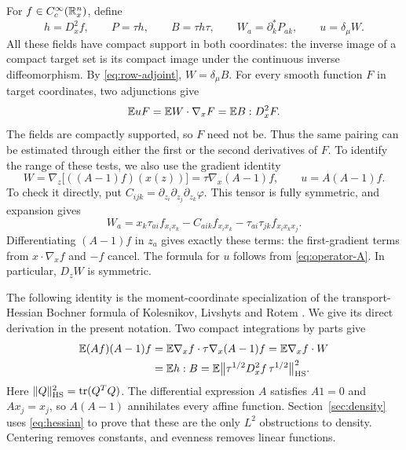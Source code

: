For $f\in C_c^\infty(\mathbb R_x^n)$, define
\begin{equation}\label{eq:test-fields}
 h=D_x^2f,\qquad P=\tau h,\qquad B=\tau h\tau,
 \qquad W_a=\partial_k^*P_{ak},\qquad u=\delta_\mu W.
\end{equation}
All these fields have compact support in both coordinates: the inverse
image of a compact target set is its compact image under the continuous
inverse diffeomorphism.  By \eqref{eq:row-adjoint},
$W=\delta_\mu B$.  For every smooth function $F$ in target coordinates,
two adjunctions give
\begin{equation}\label{eq:test-pairing}
 \mathbb E uF=\mathbb E W\cdot\nabla_xF=\mathbb E B:D_x^2F.
\end{equation}
The fields are compactly supported, so $F$ need not be.
Thus the same pairing can be estimated through either the first or the
second derivatives of $F$.
To identify the range of these tests, we also use the gradient identity
\begin{equation}\label{eq:W-gradient}
 W=\nabla_z\bigl[((A-1)f)(x(z))\bigr]
   =\tau\nabla_x(A-1)f,
 \qquad u=A(A-1)f.
\end{equation}
To check it directly, put
$C_{ijk}=\partial_{z_i}\partial_{z_j}\partial_{z_k}\varphi$.
This tensor is fully symmetric, and expansion gives
\[
 W_a=x_k\tau_{ai}f_{x_ix_k}
       -C_{aik}f_{x_ix_k}
       -\tau_{ai}\tau_{jk}f_{x_ix_kx_j}.
\]
Differentiating $(A-1)f$ in $z_a$ gives exactly these terms: the
first-gradient terms from $x\cdot\nabla_xf$ and $-f$ cancel.
The formula for $u$ follows from \eqref{eq:operator-A}.
In particular, $D_zW$ is symmetric.

The following identity is the moment-coordinate specialization of
the transport-Hessian Bochner formula of Kolesnikov, Livshyts and
Rotem \cite[Proposition~4.8]{KLR2026}. We give its direct derivation
in the present notation. Two compact integrations by parts give
\begin{equation}\label{eq:hessian}
 \begin{aligned}
 \mathbb E(Af)(A-1)f
 &=\mathbb E\nabla_x f\cdot\tau\nabla_x(A-1)f
   =\mathbb E\nabla_x f\cdot W\\
 &=\mathbb E h:B
   =\mathbb E\bigl\|\tau^{1/2}D_x^2f\,\tau^{1/2}\bigr\|_{\mathrm{HS}}^2.
 \end{aligned}
\end{equation}
Here $\|Q\|_{\mathrm{HS}}^2=\operatorname{tr}(Q^TQ)$.
The differential expression $A$ satisfies $A1=0$ and $Ax_j=x_j$,
so $A(A-1)$ annihilates every affine function.
Section~\ref{sec:density} uses \eqref{eq:hessian} to prove that these
are the only $L^2$ obstructions to density. Centering removes constants,
and evenness removes linear functions.
